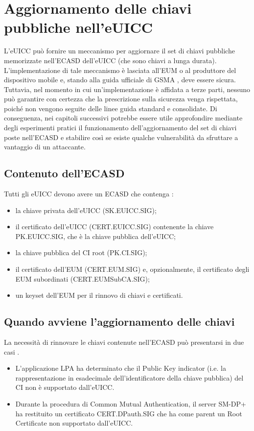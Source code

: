 \documentclass[10pt, twoside, openany]{book}
\begin{document}
\section{Aggiornamento delle chiavi pubbliche nell'eUICC}
L'eUICC può fornire un meccanismo per aggiornare il set di chiavi pubbliche memorizzate nell'ECASD dell'eUICC (che sono chiavi a lunga durata). L'implementazione di tale meccanismo è lasciata all'EUM o al produttore del dispositivo mobile e, stando alla guida ufficiale di GSMA \cite{GSMA-docs-new}, deve essere sicura. Tuttavia, nel momento in cui un'implementazione è affidata a terze parti, nessuno può garantire con certezza che la prescrizione sulla sicurezza venga rispettata, poiché non vengono seguite delle linee guida standard e consolidate. Di conseguenza, nei capitoli successivi potrebbe essere utile approfondire mediante degli esperimenti pratici il funzionamento dell'aggiornamento del set di chiavi poste nell'ECASD e stabilire così se esiste qualche vulnerabilità da sfruttare a vantaggio di un attaccante.

\subsection{Contenuto dell'ECASD}
Tutti gli eUICC devono avere un ECASD che contenga \cite{GSMA-docs-new}:
\begin{itemize}[itemsep=0pt]
\item la chiave privata dell'eUICC (SK.EUICC.SIG);
\item il certificato dell'eUICC (CERT.EUICC.SIG) contenente la chiave PK.EUICC.SIG, che è la chiave pubblica dell'eUICC;
\item la chiave pubblica del CI root (PK.CI.SIG);
\item il certificato dell'EUM (CERT.EUM.SIG) e, opzionalmente, il certificato degli EUM subordinati (CERT.EUMSubCA.SIG);
\item un keyset dell'EUM per il rinnovo di chiavi e certificati.
\end{itemize}

\subsection{Quando avviene l'aggiornamento delle chiavi}
La necessità di rinnovare le chiavi contenute nell'ECASD può presentarsi in due casi \cite{GSMA-docs-new}.
\begin{itemize}
\item L'applicazione LPA ha determinato che il Public Key indicator (i.e. la rappresentazione in esadecimale dell'identificatore della chiave pubblica) del CI non è supportato dall'eUICC.
\item Durante la procedura di Common Mutual Authentication, il server SM-DP+ ha restituito un certificato CERT.DPauth.SIG che ha come parent un Root Certificate non supportato dall'eUICC.
\end{itemize}
\end{document}
